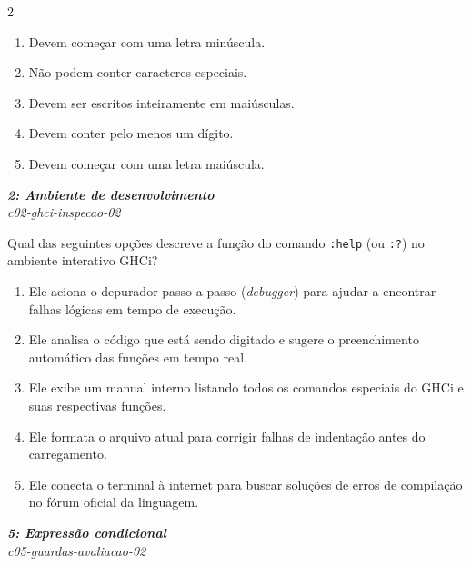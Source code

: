 \documentclass[a4paper,10pt,brazil]{article}
\begin{document}
\begin{multicols}{2}
\begin{enumerate}
  \item Devem começar com uma letra minúscula.

  \item Não podem conter caracteres especiais.

  \item Devem ser escritos inteiramente em maiúsculas.

  \item Devem conter pelo menos um dígito.

  \item Devem começar com uma letra maiúscula.


\end{enumerate}

\begin{flushright}
  \footnotesize
  \textit{\textbf{2: Ambiente de desenvolvimento}}\\
  \textit{c02-ghci-inspecao-02}\\

\end{flushright}
Qual das seguintes opções descreve a função do comando \texttt{:help} (ou \texttt{:?}) no ambiente interativo GHCi?

\begin{enumerate}
  \item Ele aciona o depurador passo a passo (\emph{debugger}) para ajudar a encontrar falhas lógicas em tempo de execução.

  \item Ele analisa o código que está sendo digitado e sugere o preenchimento automático das funções em tempo real.

  \item Ele exibe um manual interno listando todos os comandos especiais do GHCi e suas respectivas funções.

  \item Ele formata o arquivo atual para corrigir falhas de indentação antes do carregamento.

  \item Ele conecta o terminal à internet para buscar soluções de erros de compilação no fórum oficial da linguagem.


\end{enumerate}

\begin{flushright}
  \footnotesize
  \textit{\textbf{5: Expressão condicional}}\\
  \textit{c05-guardas-avaliacao-02}\\


\end{flushright}
\end{multicols}
\end{document}
